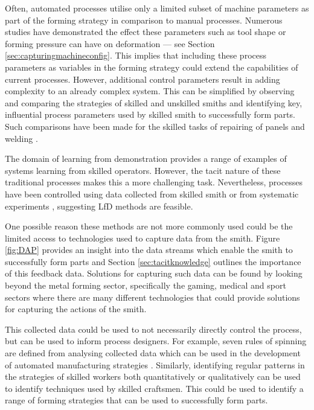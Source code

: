 Often, automated processes utilise only a limited subset of machine parameters as part of the forming strategy in comparison to manual processes. Numerous studies have demonstrated the effect these parameters such as tool shape or forming pressure can have on deformation --- see Section \ref{sec:capturingmachineconfig}. This implies that including these process parameters as variables in the forming strategy could extend the capabilities of current processes. However, additional control parameters result in adding complexity to an already complex system. This can be simplified by observing and comparing the strategies of skilled and unskilled smiths and identifying key, influential process parameters used by skilled smith to successfully form parts. Such comparisons have been made for the skilled tasks of repairing of panels \citep{Ikemoto2016ARepair} and welding \citep{Manorathna2017HumanAutomation}.

The domain of learning from demonstration provides a range of examples of systems learning from skilled operators. However, the tacit nature of these traditional processes makes this a more challenging task. Nevertheless, processes have been controlled using data collected from skilled smith \citep{Ilangovan2016AnForming} or from systematic experiments \citep{Ilangovan2016FixturelessForming,Mori1996DeterminationAlgorithm, Mori1998IncrementalDatabase,Opritescu2012AutomatedStrategy,Opritescu2016VariationVariance,Hartmann2019Knowledge-basedPartitioning,Opritescu2015AutomatedApproach,Hartmann2019AnFree-forming,Rossi2018ModellingWheel, Rossi2018Re/LearningSurfaces,Auer2004ComparisonSpinning,Henkenjohann2005AnProcess,Arai2006Force-controlledMotors}, suggesting LfD methods are feasible.

One possible reason these methods are not more commonly used could be the limited access to technologies used to capture data from the smith.  Figure \ref{fig:DAP} provides an insight into the data streams which enable the smith to successfully form parts and Section \ref{sec:tacitknowledge} outlines the importance of this feedback data. Solutions for capturing such data can be found by looking beyond the metal forming sector, specifically the gaming, medical and sport sectors where there are many different technologies that could provide solutions for capturing the actions of the smith.

This collected data could be used to not necessarily directly control the process, but can be used to inform process designers. For example, seven rules of spinning are defined from analysing collected data which can be used in the development of automated manufacturing strategies \citep{Russo2021SevenSpinning}. Similarly, identifying regular patterns in the strategies of skilled workers both quantitatively \citep{Kalt2016TowardsOperation,Phan2018InstrumentationWorkpiece} or qualitatively \citep{Cutkosky1986ModellingHands,Elkington2015HandProcess} can be used to identify techniques used by skilled craftsmen. This could be used to identify a range of forming strategies that can be used to successfully form parts.


